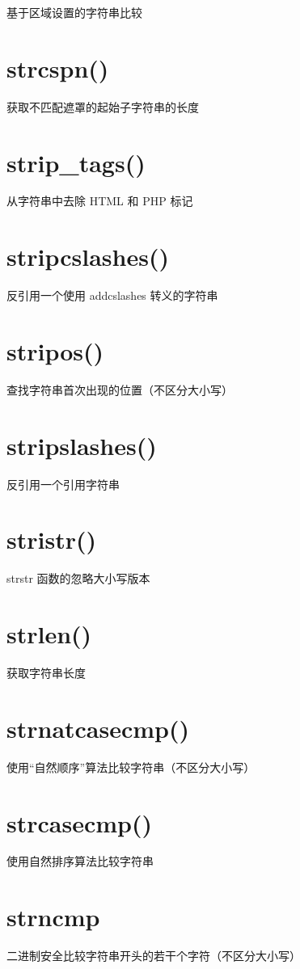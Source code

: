 基于区域设置的字符串比较
\section{strcspn()}
获取不匹配遮罩的起始子字符串的长度

\section{strip\_tags()}

从字符串中去除 HTML 和 PHP 标记
\section{stripcslashes()}
反引用一个使用 addcslashes 转义的字符串

\section{stripos()}

查找字符串首次出现的位置（不区分大小写）
\section{stripslashes()}

反引用一个引用字符串
\section{stristr()}

strstr 函数的忽略大小写版本
\section{strlen()}

获取字符串长度
\section{strnatcasecmp()}

使用“自然顺序”算法比较字符串（不区分大小写）
\section{strcasecmp()}

使用自然排序算法比较字符串


\section{strncmp}


二进制安全比较字符串开头的若干个字符（不区分大小写）

